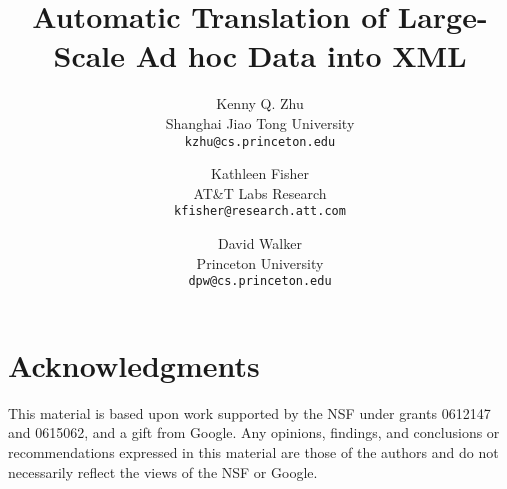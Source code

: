 \documentclass{sig-alternate}
\title{Automatic Translation of Large-Scale Ad hoc Data into XML}
\author{Kenny Q. Zhu \\
	   Shanghai Jiao Tong University\\
       {\small \tt kzhu@cs.princeton.edu}
	\and Kathleen Fisher \\
	   AT\&T Labs Research\\
       {\small \tt kfisher@research.att.com}
	\and David Walker \\
	   Princeton University\\
       {\small \tt dpw@cs.princeton.edu}}
\date{}
\begin{document}


\maketitle














\small
\section*{Acknowledgments}
This material is based upon work
 supported by the NSF under grants 0612147 and 0615062, and
a gift from Google. Any opinions, findings, and conclusions or recommendations
expressed in this material are those of the authors and do not
necessarily reflect the views of the NSF or Google.


%



%
\end{document}
